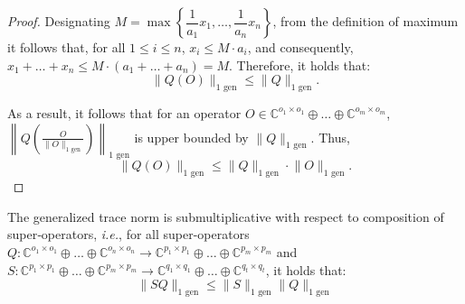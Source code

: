 \begin{proof}
  Designating $M = \max \left\{   \dfrac{1}{a_1} x_1  , \ldots , \dfrac{1}{a_n} x_n   \right\}$, from the definition of maximum it follows that, for all $1 \leq i \leq n$, $x_i \leq M \cdot a_i$, and consequently, $x_1 + \ldots + x_n \leq M \cdot (a_1 + \ldots + a_n) = M$. Therefore, it holds that:
  \begin{equation}
    \lVert Q(O) \rVert_{1 \text{ gen}} \leq  \lVert Q \rVert_{1 \text{ gen}}.
  \end{equation} 

  As a result, it follows that for an operator $O \in \mathbb{C}^{o_1 \times o_1} \oplus \ldots \oplus  \mathbb{C}^{o_m \times o_m}$,  $ \left\lVert Q\left(\frac{O}{\lVert O \rVert_{1 \text{ gen}}}\right)  \right\rVert_{1 \text{ gen}}$ is upper bounded by $\lVert Q  \rVert_{1 \text{ gen}}$. Thus, 
\begin{equation}
  \lVert Q(O) \rVert_{1 \text{ gen}} \leq \lVert Q  \rVert_{1 \text{ gen}} \cdot \lVert O  \rVert_{1 \text{ gen}}.
\end{equation}
\end{proof}


\begin{lemma}\label{lem:gen_trace_submultiplicative}
  The generalized trace norm is submultiplicative with respect to composition of super‑operators, \textit{i.e.}, for all super-operators $Q: \mathbb{C}^{o_1 \times o_1} \oplus \ldots \oplus \mathbb{C}^{o_n \times o_n}  \rightarrow \mathbb{C}^{p_1 \times p_1} \oplus \ldots \oplus  \mathbb{C}^{p_m \times p_m}$ and $S: \mathbb{C}^{p_1 \times p_1} \oplus \ldots \oplus \mathbb{C}^{p_m \times p_m}  \rightarrow \mathbb{C}^{q_1 \times q_1} \oplus \ldots \oplus \mathbb{C}^{q_t \times q_t}$, it holds that:
  \begin{equation} \label{eq:gen_trace_submultiplicative}
    \lVert S  Q \rVert_{1 \text{ gen}} \leq \lVert S \rVert_{1 \text{ gen}} \lVert Q \rVert_{1 \text{ gen}}
  \end{equation}
\end{lemma}

